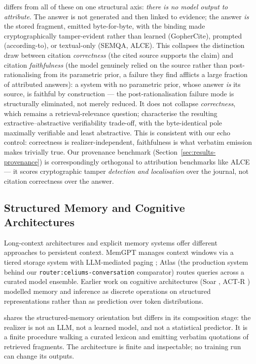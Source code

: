 \hyphae{} differs from all of these on one structural axis:
\emph{there is no model output to attribute}. The answer is not
generated and then linked to evidence; the answer \emph{is} the
stored fragment, emitted byte-for-byte, with the binding made
cryptographically tamper-evident rather than learned (GopherCite),
prompted (according-to), or textual-only (SEMQA, ALCE). This
collapses the distinction \citet{wallat2024faithfulness} draw
between citation \emph{correctness} (the cited source supports the
claim) and citation \emph{faithfulness} (the model genuinely relied
on the source rather than post-rationalising from its parametric
prior, a failure they find afflicts a large fraction of attributed
answers): a system with no parametric prior, whose answer \emph{is}
its source, is faithful by construction --- the post-rationalisation
failure mode is structurally eliminated, not merely reduced. It does
not collapse \emph{correctness}, which remains a retrieval-relevance
question; \citet{worledge2024extractive} characterise the resulting
extractive--abstractive verifiability trade-off, with the
byte-identical pole maximally verifiable and least abstractive. This
is consistent with our echo control: correctness is
realizer-independent, faithfulness is what verbatim emission makes
trivially true. Our provenance benchmark
(Section~\ref{sec:results-provenance}) is correspondingly orthogonal
to attribution benchmarks like ALCE --- it scores cryptographic
tamper \emph{detection and localisation} over the journal, not
citation correctness over the answer.

\subsection{Structured Memory and Cognitive Architectures}

Long-context architectures and explicit memory systems offer
different approaches to persistent context. MemGPT manages
context windows via a tiered storage system with LLM-mediated
paging \citep{packer2024memgpt}; Atlas (the production system
behind our \texttt{router:celiums-conversation} comparator) routes
queries across a curated model ensemble. Earlier work on cognitive
architectures (Soar \citep{laird2012cognitive}, ACT-R
\citep{anderson2014actr}) modelled memory and inference as
discrete operations on structured representations rather than as
prediction over token distributions.

\hyphae{} shares the structured-memory orientation but differs in
its composition stage: the realizer is not an LLM, not a learned
model, and not a statistical predictor. It is a finite procedure
walking a curated lexicon and emitting verbatim quotations of
retrieved fragments. The architecture is finite and inspectable;
no training run can change its outputs.

